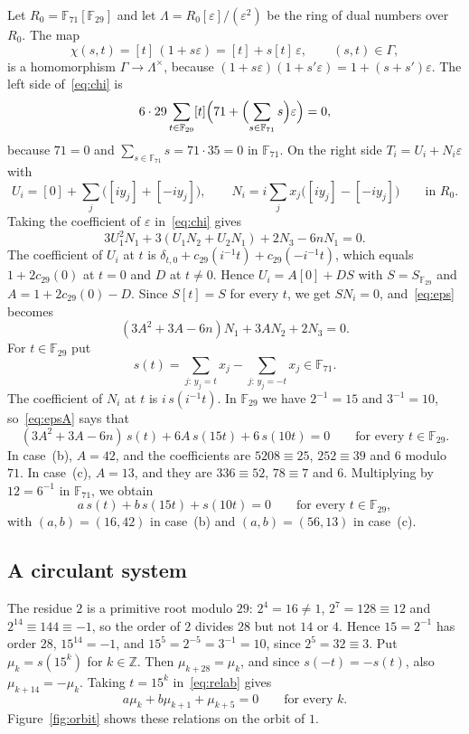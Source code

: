 \documentclass{amsart}
\theoremstyle{definition}
\theoremstyle{remark}
\numberwithin{equation}{section}
\newcommand{\Z}{\mathbb{Z}}
\newcommand{\F}{\mathbb{F}}
\newcommand{\gp}[1]{[#1]}
\begin{document}
Let $R_0=\F_{71}[\F_{29}]$ and let $\Lambda=R_0[\varepsilon]/(\varepsilon^2)$ be the ring of dual numbers over $R_0$. The map
\[
\chi(s,t)=\gp{t}\,(1+s\varepsilon)=\gp{t}+s\gp{t}\,\varepsilon,\qquad (s,t)\in\Gamma,
\]
is a homomorphism $\Gamma\to\Lambda^\times$, because $(1+s\varepsilon)(1+s'\varepsilon)=1+(s+s')\varepsilon$. The left side of~\eqref{eq:chi} is
\[
6\cdot29\sum_{t\in\F_{29}}\gp{t}\Bigl(71+\Bigl(\sum_{s\in\F_{71}}s\Bigr)\varepsilon\Bigr)=0,
\]
because $71=0$ and $\sum_{s\in\F_{71}}s=71\cdot35=0$ in $\F_{71}$. On the right side $T_i=U_i+N_i\varepsilon$ with
\[
U_i=\gp0+\sum_j\bigl(\gp{iy_j}+\gp{-iy_j}\bigr),\qquad N_i=i\sum_jx_j\bigl(\gp{iy_j}-\gp{-iy_j}\bigr)\qquad\text{in }R_0.
\]
Taking the coefficient of $\varepsilon$ in~\eqref{eq:chi} gives
\begin{equation}\label{eq:eps}
3U_1^2N_1+3(U_1N_2+U_2N_1)+2N_3-6nN_1=0.
\end{equation}
The coefficient of $U_i$ at $t$ is $\delta_{t,0}+c_{29}(i^{-1}t)+c_{29}(-i^{-1}t)$, which equals $1+2c_{29}(0)$ at $t=0$ and $D$ at $t\ne0$. Hence $U_i=A\gp0+DS$ with $S=S_{\F_{29}}$ and $A=1+2c_{29}(0)-D$. Since $S\gp{t}=S$ for every $t$, we get $SN_i=0$, and~\eqref{eq:eps} becomes
\begin{equation}\label{eq:epsA}
(3A^2+3A-6n)N_1+3AN_2+2N_3=0.
\end{equation}
For $t\in\F_{29}$ put
\[
s(t)=\sum_{j:\,y_j=t}x_j-\sum_{j:\,y_j=-t}x_j\in\F_{71}.
\]
The coefficient of $N_i$ at $t$ is $i\,s(i^{-1}t)$. In $\F_{29}$ we have $2^{-1}=15$ and $3^{-1}=10$, so~\eqref{eq:epsA} says that
\begin{equation}\label{eq:rel}
(3A^2+3A-6n)\,s(t)+6A\,s(15t)+6\,s(10t)=0\qquad\text{for every }t\in\F_{29}.
\end{equation}
In case~(b), $A=42$, and the coefficients are $5208\equiv25$, $252\equiv39$ and $6$ modulo $71$. In case~(c), $A=13$, and they are $336\equiv52$, $78\equiv7$ and $6$. Multiplying by $12=6^{-1}$ in $\F_{71}$, we obtain
\begin{equation}\label{eq:relab}
a\,s(t)+b\,s(15t)+s(10t)=0\qquad\text{for every }t\in\F_{29},
\end{equation}
with $(a,b)=(16,42)$ in case~(b) and $(a,b)=(56,13)$ in case~(c).

\subsection{A circulant system}\label{ssec:circ}
The residue $2$ is a primitive root modulo $29$: $2^4=16\ne1$, $2^7=128\equiv12$ and $2^{14}\equiv144\equiv-1$, so the order of $2$ divides $28$ but not $14$ or $4$. Hence $15=2^{-1}$ has order $28$, $15^{14}=-1$, and $15^5=2^{-5}=3^{-1}=10$, since $2^5=32\equiv3$. Put $\mu_k=s(15^k)$ for $k\in\Z$. Then $\mu_{k+28}=\mu_k$, and since $s(-t)=-s(t)$, also $\mu_{k+14}=-\mu_k$. Taking $t=15^k$ in~\eqref{eq:relab} gives
\begin{equation}\label{eq:mu}
a\mu_k+b\mu_{k+1}+\mu_{k+5}=0\qquad\text{for every }k.
\end{equation}
Figure~\ref{fig:orbit} shows these relations on the orbit of $1$.
\end{document}
